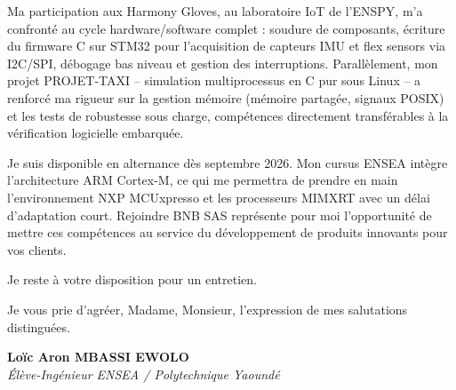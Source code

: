 \documentclass[a4paper,11pt]{article}
\begin{document}
Ma participation aux Harmony Gloves, au laboratoire IoT de l'ENSPY, m'a confronté au cycle hardware/software complet : soudure de composants, écriture du firmware C sur STM32 pour l'acquisition de capteurs IMU et flex sensors via I2C/SPI, débogage bas niveau et gestion des interruptions. Parallèlement, mon projet PROJET-TAXI -- simulation multiprocessus en C pur sous Linux -- a renforcé ma rigueur sur la gestion mémoire (mémoire partagée, signaux POSIX) et les tests de robustesse sous charge, compétences directement transférables à la vérification logicielle embarquée.

Je suis disponible en alternance dès septembre 2026. Mon cursus ENSEA intègre l'architecture ARM Cortex-M, ce qui me permettra de prendre en main l'environnement NXP MCUxpresso et les processeurs MIMXRT avec un délai d'adaptation court. Rejoindre BNB SAS représente pour moi l'opportunité de mettre ces compétences au service du développement de produits innovants pour vos clients.

Je reste à votre disposition pour un entretien.

Je vous prie d'agréer, Madame, Monsieur, l'expression de mes salutations distinguées.

\vspace{0.8cm}

\textbf{Loïc Aron MBASSI EWOLO}\\
\textit{Élève-Ingénieur ENSEA / Polytechnique Yaoundé}
\end{document}
